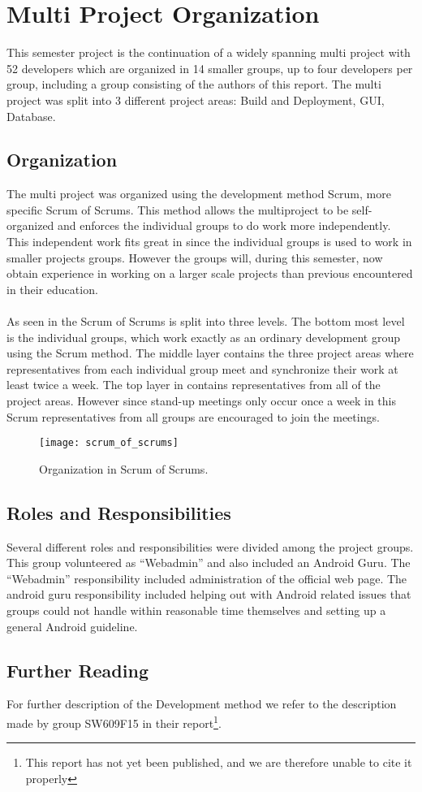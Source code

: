 
\section{Multi Project Organization}
\label{sec:multi_project_organization}

This semester project is the continuation of a widely spanning multi project with 52 developers which are organized in 14 smaller groups, up to four developers per group, including a group consisting of the authors of this report. The multi project was split into 3 different project areas: Build and Deployment, GUI, Database. 

\subsection{Organization}
The multi project was organized using the development method Scrum\parencite{scrum}, more specific Scrum of Scrums. This method allows the multiproject to be self-organized and enforces the individual groups to do work more independently. This independent work fits great in since the individual groups is used to work in smaller projects groups. However the groups will, during this semester, now obtain experience in working on a larger scale projects than previous encountered in their education. 
\\\\
As seen in  the Scrum of Scrums is split into three levels. The bottom most level is the individual groups, which work exactly as an ordinary development group using the Scrum method. The middle layer contains the three project areas where representatives from each individual group meet and synchronize their work at least twice a week. The top layer in  contains representatives from all of the project areas. However since stand-up meetings only occur once a week in this Scrum representatives from all groups are encouraged to join the meetings.

\begin{figure}[!htbp]
  \centering
    \texttt{[image: scrum\_of\_scrums]}
    \caption{Organization in Scrum of Scrums.}
    \label{fig:scrum_of_scrums}
\end{figure}

\subsection{Roles and Responsibilities}
Several different roles and responsibilities were divided among the project groups. This group volunteered as ``Webadmin'' and also included an Android Guru. The ``Webadmin'' responsibility included administration of the official \giraf web page. The android guru responsibility included helping out with Android related issues that groups could not handle within reasonable time themselves and setting up a general Android guideline. 

\subsection{Further Reading}
For further description of the \giraf Development method we refer to the description made by group SW609F15 in their report\footnote{This report has not yet been published, and we are therefore unable to cite it properly}.